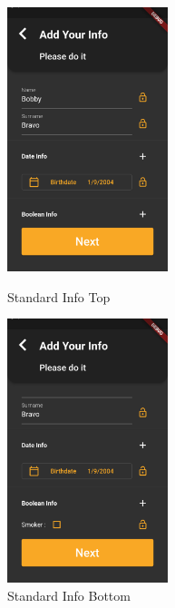 \documentclass{article}
\begin{document}
\begin{figure}[!htb]
	\centering
	\begin{minipage}{.45\textwidth}
		\centering
		\includegraphics[height=7.7cm,keepaspectratio]{assets/images/ui/signup/07-standard-info-date.png}
		\caption{Standard Info Top}
	\end{minipage}\quad
	\begin{minipage}{.45\textwidth}
		\centering
		\includegraphics[height=7.7cm,keepaspectratio]{assets/images/ui/signup/08-standard-info-bool.png}
		\caption{Standard Info Bottom}
	\end{minipage}
\end{figure}
\end{document}
